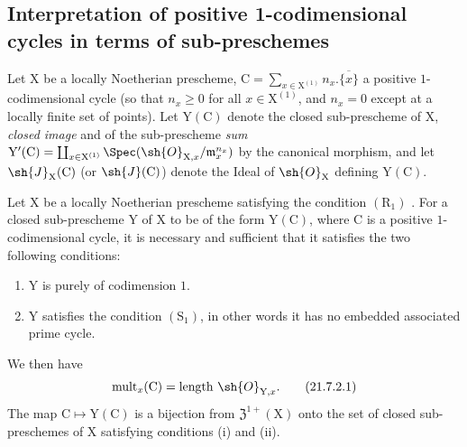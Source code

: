 \subsection{Interpretation of positive 1-codimensional cycles in terms of sub-preschemes}
\label{subsection:IV.21.7}

\begin{env}[21.7.1]
\label{IV.21.7.1}
Let $\mathrm{X}$ be a locally Noetherian prescheme, $\mathrm{C}=\sum_{x\in\mathrm{X}^{(1)}}n_x.\overline{\{x\}}$ a positive $1$-codimensional cycle (so that $n_x\geq 0$ for all $x\in\mathrm{X}^{(1)}$, and $n_x=0$ except at a locally finite set of points).
Let $\mathrm{Y}(\mathrm{C})$ denote the closed sub-prescheme of $\mathrm{X}$, \emph{closed image}  and  of the sub-prescheme \emph{sum} $\mathrm{Y}'(\mathrm{C})=\coprod_{x\in\mathrm{X}^{(1)}}\Spec(\sh{O}_{\mathrm{X},x}/\mathfrak{m}_x^{n_x})$ by the canonical morphism, and let $\sh{J}_\mathrm{X}(\mathrm{C})$ (or $\sh{J}(\mathrm{C})$) denote the Ideal of $\sh{O}_\mathrm{X}$ defining $\mathrm{Y}(\mathrm{C})$.
\end{env}

\begin{proposition}[21.7.2]
\label{IV.21.7.2}
Let $\mathrm{X}$ be a locally Noetherian prescheme satisfying the condition $(\mathrm{R}_1)$ .
For a closed sub-prescheme $\mathrm{Y}$ of $\mathrm{X}$ to be of the form $\mathrm{Y}(\mathrm{C})$, where $\mathrm{C}$ is a positive $1$-codimensional cycle, it is necessary and sufficient that it satisfies the two following conditions:
\begin{enumerate}[label=(\roman*)]
  \item $\mathrm{Y}$ is purely of codimension $1$.
  \item $\mathrm{Y}$ satisfies the condition $(\mathrm{S}_1)$, in other words  it has no embedded associated prime cycle.
\end{enumerate}
We then have
\[
\label{IV.21.7.2.1}
  \operatorname{mult}_x(\mathrm{C})=\operatorname{length}\,\sh{O}_{\mathrm{Y},x}.
  \tag{21.7.2.1}
\]
The map $\mathrm{C}\mapsto\mathrm{Y}(\mathrm{C})$ is a bijection from $\mathfrak{Z}^{1+}(\mathrm{X})$ onto the set of closed sub-preschemes of $\mathrm{X}$ satisfying conditions (i) and (ii).
\end{proposition}

